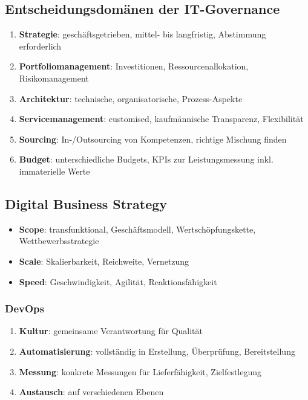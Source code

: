 \documentclass{article}
\begin{document}
\subsection{Entscheidungsdomänen der IT-Governance}
\begin{enumerate}
  \item \textbf{Strategie}: geschäftsgetrieben, mittel- bis langfristig, Abstimmung erforderlich
  \item \textbf{Portfoliomanagement}: Investitionen, Ressourcenallokation, Risikomanagement
  \item \textbf{Architektur}: technische, organisatorische, Prozess-Aspekte
  \item \textbf{Servicemanagement}: customised, kaufmännische Transparenz, Flexibilität
  \item \textbf{Sourcing}: In-/Outsourcing von Kompetenzen, richtige Mischung finden
  \item \textbf{Budget}: unterschiedliche Budgets, KPIs zur Leistungsmessung inkl. immaterielle Werte
\end{enumerate}



\subsection{Digital Business Strategy}
\begin{itemize}
  \item \textbf{Scope}: transfunktional, Geschäftsmodell, Wertschöpfungskette, Wettbewerbsstrategie
  \item \textbf{Scale}: Skalierbarkeit, Reichweite, Vernetzung
  \item \textbf{Speed}: Geschwindigkeit, Agilität, Reaktionsfähigkeit
\end{itemize}

\subsubsection{DevOps}
\begin{enumerate}
  \item \textbf{Kultur}: gemeinsame Verantwortung für Qualität
  \item \textbf{Automatisierung}: vollständig in Erstellung, Überprüfung, Bereitstellung
  \item \textbf{Messung}: konkrete Messungen für Lieferfähigkeit, Zielfestlegung
  \item \textbf{Austausch}: auf verschiedenen Ebenen
\end{enumerate}
\end{document}
